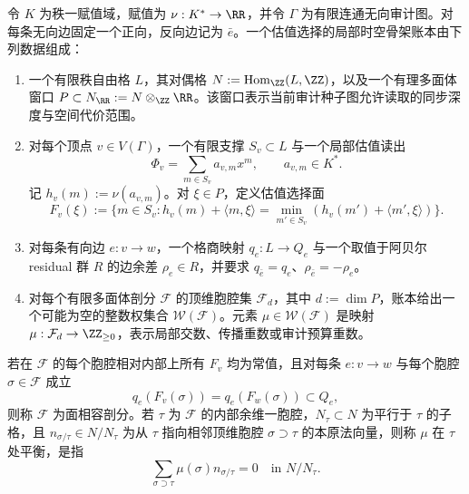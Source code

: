 \begin{definition}[估值选择的局部时空骨架账本]\label{distill:khovanskii_newton_polyhedra_fewnomials_and_tropical_skeletons-valuation_and_tropical_degeneration-local-spacetime-ledger}
令 \(K\) 为秩一赋值域，赋值为 \(\nu:K^*\to\RR\)，并令 \(\Gamma\) 为有限连通无向审计图。对每条无向边固定一个正向，反向边记为 \(\bar e\)。一个估值选择的局部时空骨架账本由下列数据组成：
\begin{enumerate}
  \item 一个有限秩自由格 \(L\)，其对偶格 \(N:=\operatorname{Hom}_{\ZZ}(L,\ZZ)\)，以及一个有理多面体窗口 \(P\subset N_{\RR}:=N\otimes_{\ZZ}\RR\)。该窗口表示当前审计种子图允许读取的同步深度与空间代价范围。
  \item 对每个顶点 \(v\in V(\Gamma)\)，一个有限支撑 \(S_v\subset L\) 与一个局部估值读出
  \[
  \Phi_v=\sum_{m\in S_v}a_{v,m}x^m,\qquad a_{v,m}\in K^*.
  \]
  记 \(h_v(m):=\nu(a_{v,m})\)。对 \(\xi\in P\)，定义估值选择面
  \[
  F_v(\xi):=\{m\in S_v:h_v(m)+\langle m,\xi\rangle=\min_{m'\in S_v}(h_v(m')+\langle m',\xi\rangle)\}.
  \]
  \item 对每条有向边 \(e:v\to w\)，一个格商映射 \(q_e:L\to Q_e\) 与一个取值于阿贝尔 residual 群 \(R\) 的边余差 \(\rho_e\in R\)，并要求 \(q_{\bar e}=q_e\)、\(\rho_{\bar e}=-\rho_e\)。
  \item 对每个有限多面体剖分 \(\mathcal F\) 的顶维胞腔集 \(\mathcal F_d\)，其中 \(d:=\dim P\)，账本给出一个可能为空的整数权集合 \(\mathcal W(\mathcal F)\)。元素 \(\mu\in\mathcal W(\mathcal F)\) 是映射 \(\mu:\mathcal F_d\to\ZZ_{\ge0}\)，表示局部交数、传播重数或审计预算重数。
\end{enumerate}
若在 \(\mathcal F\) 的每个胞腔相对内部上所有 \(F_v\) 均为常值，且对每条 \(e:v\to w\) 与每个胞腔 \(\sigma\in\mathcal F\) 成立
\[
q_e(F_v(\sigma))=q_e(F_w(\sigma))\subset Q_e,
\]
则称 \(\mathcal F\) 为面相容剖分。若 \(\tau\) 为 \(\mathcal F\) 的内部余维一胞腔，\(N_\tau\subset N\) 为平行于 \(\tau\) 的子格，且 \(n_{\sigma/\tau}\in N/N_\tau\) 为从 \(\tau\) 指向相邻顶维胞腔 \(\sigma\supset\tau\) 的本原法向量，则称 \(\mu\) 在 \(\tau\) 处平衡，是指
\[
\sum_{\sigma\supset\tau}\mu(\sigma)n_{\sigma/\tau}=0\quad\text{in }N/N_\tau.
\]
\end{definition}

